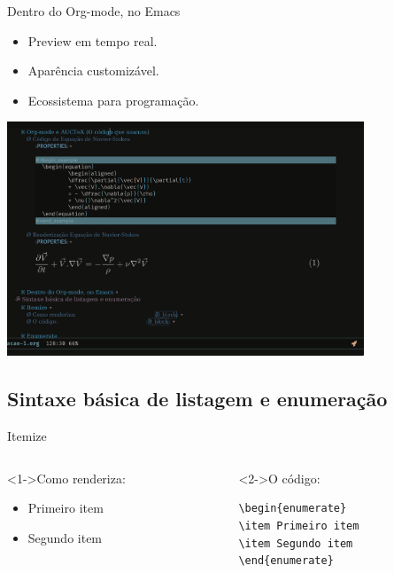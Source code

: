 \documentclass[bigger]{beamer}
\begin{document}
{\begin{frame}[label={sec:org515ff6e}]{Dentro do Org-mode, no Emacs}
\begin{itemize}[<+->]
\item Preview em tempo real.
\item Aparência customizável.
\item Ecossistema para programação.
\end{itemize}

\href{img/orgmode-auctex.png}{\includegraphics[center,width=0.8\textwidth]{./img/orgmode-auctex2.png}}
\end{frame}

\subsection{Sintaxe básica de listagem e enumeração}
\label{sec:org4997c80}
\begin{frame}[label={sec:org6f972da},fragile]{Itemize}
 \begin{columns}
\begin{column}{0.48\columnwidth}
\begin{block}<1->{Como renderiza:}
\begin{itemize}
\item Primeiro item
\item Segundo item
\end{itemize}
\end{block}
\end{column}

\begin{column}{0.48\columnwidth}
\begin{block}<2->{O código:}
\begin{verbatim}
\begin{enumerate}
\item Primeiro item
\item Segundo item
\end{enumerate}
\end{verbatim}
\end{block}
\end{column}
\end{columns}
\end{frame}

}
\end{document}
